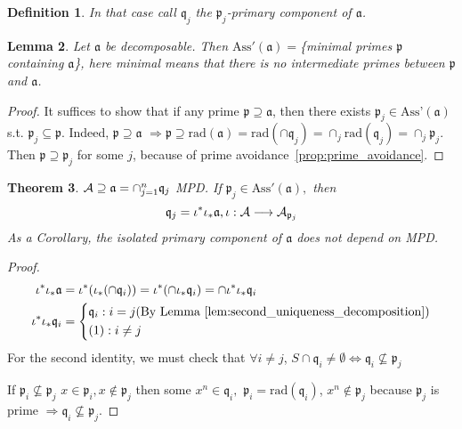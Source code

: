 \documentclass[11pt]{article}
\newtheorem{thm}{Theorem}[section]
\newtheorem{lemma}[thm]{Lemma}
\newtheorem{dfn}[thm]{Definition}
\newcommand{\sca}{{\mathfrak a}}
\newcommand{\scp}{{\mathfrak p}}
\newcommand{\scq}{\mathfrak q}
\newcommand{\cala}{{\cal A}}
\newcommand{\Lrta}{\Longrightarrow}
\newcommand{\lrta}{\longrightarrow}
\newcommand{\Llrta}{\Longleftrightarrow}
\begin{document}
\begin{dfn}
In that case call $\scq_j$ the $\scp_j$-primary component of  $\sca$.
\end{dfn}

\begin{lemma}\label{lem:Ass'_mimial_primes}
Let $\sca$ be decomposable. Then $\text{Ass}'(\sca)=$\{minimal primes $\scp$ containing $\sca$\}, here minimal means that there is no intermediate primes between $\scp$
 and $\sca$.
\end{lemma}
\begin{proof}
It suffices to show that if any prime $\scp\supseteq \sca$, then there exists $\scp_j\in \text{Ass'}(\sca)$ s.t. $\scp_j\subseteq \scp$. Indeed, $\scp\supseteq\sca$ $\Lrta\scp\supseteq\text{rad}(\sca)=\text{rad}(\cap \scq_j)=\cap_j\text{rad}(\scq_j)=\cap_j\scp_j$. Then $\scp\supseteq\scp_j$ for some $j$, because of prime avoidance~\ref{prop:prime_avoidance}.
\end{proof}

\begin{thm}
$\cala\supseteq \sca=\cap_{j=1}^n\scq_j$ MPD. If $\scp_j \in \text{Ass}'(\sca),$ then 
$$
\scq_j=\iota^*\iota_*\sca,\iota:\cala\lrta \cala_{\scp_{j}}
$$
As a Corollary, the isolated primary component of $\sca$ does not depend on MPD.
\end{thm}
\begin{proof}
$$
\begin{aligned}
\iota^*\iota_*\sca&=\iota^*(\iota_*(\cap\scq_i))=\iota^*(\cap\iota_*\scq_i)=\cap\iota^*\iota_*\scq_i\\
\iota^*\iota_*\scq_i&
=\left\{
\begin{aligned}
&\scq_i: i= j(\text{By Lemma~\ref{lem:second_uniqueness_decomposition}})\\
& (1) :i\neq j
\end{aligned}
\right.
\end{aligned}
$$
For the second identity, we must check that $\forall i\neq j$, $S\cap \scq_i\neq \emptyset\Llrta \scq_i\not\subseteq \scp_j$

If $\scp_i\not\subseteq \scp_j$ $x\in\scp_i,x\notin\scp_j$ then some $x^n\in\scq_i,$ $\scp_i=\text{rad}(\scq_i)$, $x^n\notin \scp_j$ because $\scp_j$ is prime $\Lrta \scq_i\not\subseteq \scp_j$.
\end{proof}
\end{document}
